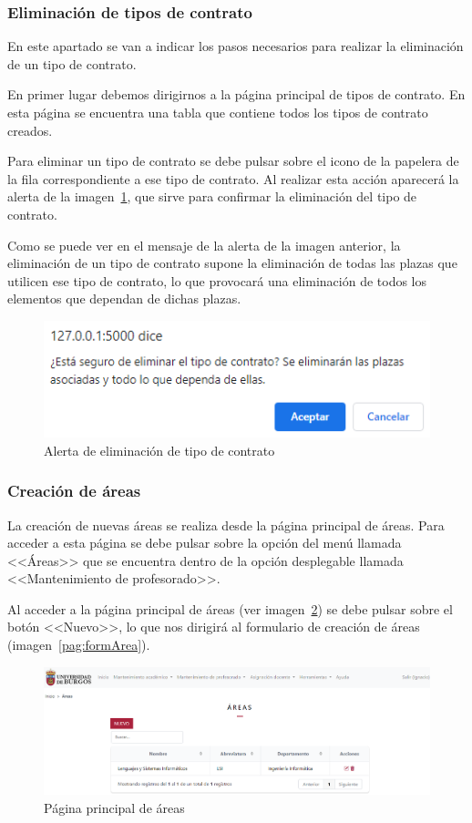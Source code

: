 \subsubsection{Eliminación de tipos de contrato}
En este apartado se van a indicar los pasos necesarios para realizar la eliminación de un tipo de contrato.

En primer lugar debemos dirigirnos a la página principal de tipos de contrato.
En esta página se encuentra una tabla que contiene todos los tipos de contrato creados.

Para eliminar un tipo de contrato se debe pulsar sobre el icono de la papelera de la fila correspondiente a ese tipo de contrato.
Al realizar esta acción aparecerá la alerta de la imagen~\ref{pag:alertElContrato}, que sirve para confirmar la eliminación del tipo de contrato.

Como se puede ver en el mensaje de la alerta de la imagen anterior, la eliminación de un tipo de contrato supone la eliminación de todas las plazas que utilicen ese tipo de contrato, lo que provocará una eliminación de todos los elementos que dependan de dichas plazas.

\begin{figure}
	\centering
	\includegraphics[width=.65\textwidth]{../img/Anexos/Manual usuario/alertElContrato.png}
	\caption{Alerta de eliminación de tipo de contrato}\label{pag:alertElContrato}
\end{figure}


\subsubsection{Creación de áreas}
La creación de nuevas áreas se realiza desde la página principal de áreas.
Para acceder a esta página se debe pulsar sobre la opción del menú llamada <<Áreas>> que se encuentra dentro de la opción desplegable llamada <<Mantenimiento de profesorado>>.

Al acceder a la página principal de áreas (ver imagen~\ref{pag:areas}) se debe pulsar sobre el botón <<Nuevo>>, lo que nos dirigirá al formulario de creación de áreas (imagen~\ref{pag:formArea}).

\begin{figure}
	\centering
	\includegraphics[width=\textwidth]{../img/Anexos/Manual usuario/areas.png}
	\caption{Página principal de áreas}\label{pag:areas}
\end{figure}

